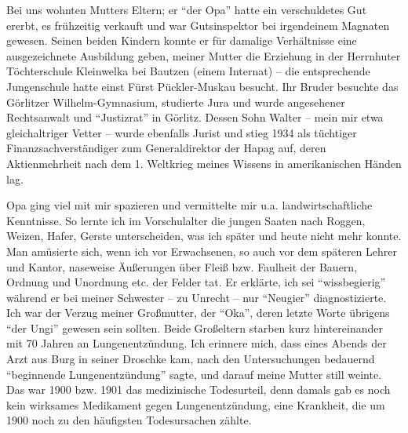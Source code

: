 \documentclass[a5paper,pagesize,10pt,twoside=true]{scrbook}
\begin{document}
Bei uns wohnten Mutters Eltern; er \enquote{der Opa} hatte ein verschuldetes Gut ererbt, es frühzeitig verkauft und war Gutsinspektor bei irgendeinem Magnaten gewesen. Seinen beiden Kindern konnte er für damalige Verhältnisse eine ausgezeichnete Ausbildung geben, meiner Mutter die Erziehung in der Herrnhuter Töchterschule Kleinwelka bei Bautzen (einem Internat) -- die entsprechende Jungenschule hatte einst Fürst Pückler-Muskau besucht. Ihr Bruder besuchte das Görlitzer Wilhelm-Gymnasium, studierte Jura und wurde angesehener Rechtsanwalt und \enquote{Justizrat} in Görlitz. Dessen Sohn Walter -- mein mir etwa gleichaltriger Vetter -- wurde ebenfalls Jurist und stieg 1934 als tüchtiger Finanzsachverständiger zum Generaldirektor der Hapag auf, deren Aktienmehrheit nach dem 1. Weltkrieg meines Wissens in amerikanischen Händen lag.

Opa ging viel mit mir spazieren und vermittelte mir u.a. landwirtschaftliche Kenntnisse. So lernte ich im Vorschulalter die jungen Saaten nach Roggen, Weizen, Hafer, Gerste unterscheiden, was ich später und heute nicht mehr konnte. Man amüsierte sich, wenn ich vor Erwachsenen, so auch vor dem späteren Lehrer und Kantor, naseweise Äußerungen über Fleiß bzw. Faulheit der Bauern, Ordnung und Unordnung etc. der Felder tat. Er erklärte, ich sei \enquote{wissbegierig} während er bei meiner Schwester -- zu Unrecht -- nur \enquote{Neugier} diagnostizierte. Ich war der Verzug meiner Großmutter, der \enquote{Oka}, deren letzte Worte übrigens \enquote{der Ungi} gewesen sein sollten. Beide Großeltern starben kurz hintereinander mit 70 Jahren an Lungenentzündung. Ich erinnere mich, dass eines Abends der Arzt aus Burg in seiner Droschke kam, nach den Untersuchungen bedauernd \enquote{beginnende Lungenentzündung} sagte, und darauf meine Mutter still weinte. Das war 1900 bzw. 1901 das medizinische Todesurteil, denn damals gab es noch kein wirksames Medikament gegen Lungenentzündung, eine Krankheit, die um 1900 noch zu den häufigsten Todesursachen zählte.
\end{document}
